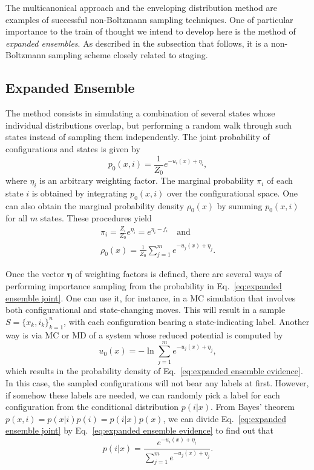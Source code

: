 \documentclass[aip,jcp,preprint,amsmath,amssymb]{revtex4-1}
\newcommand{\vt}[1]{\boldsymbol{\mathbf{#1}}}           %
\begin{document}
The multicanonical approach\cite{Berg_1992, Lee_1993, Abreu_2006} and the enveloping distribution method\cite{Christ_2007, *Christ_2008, *Christ_2009} are examples of successful non-Boltzmann sampling techniques. One of particular importance to the train of thought we intend to develop here is the method of \textit{expanded ensembles}.\cite{Lyubartsev_1992} As described in the subsection that follows, it is a non-Boltzmann sampling scheme closely related to staging.

\subsection{Expanded Ensemble}

The method consists in simulating a combination of several states whose individual distributions overlap, but performing a random walk through such states instead of sampling them independently. The joint probability of configurations and states is given by\cite{Nymeyer_2010}
\begin{equation}
\label{eq:expanded ensemble joint}
p_0(x, i) = \frac{1}{Z_0} e^{-u_i(x) + \eta_i},
\end{equation}
where $\eta_i$ is an arbitrary weighting factor. The marginal probability $\pi_i$ of each state $i$ is obtained by integrating $p_0(x,i)$ over the configurational space. One can also obtain the marginal probability density $\rho_0(x)$ by summing $p_0(x,i)$ for all $m$ states. These procedures yield
\begin{align}
\pi_i = \frac{Z_i}{Z_0} e^{\eta_i} = e^{\eta_i - f_i} \quad \text{and} \label{eq:expanded ensemble prior} \\
\rho_0(x) = \frac{1}{Z_0} \sum_{j=1}^m e^{-u_j(x) + \eta_j}. \label{eq:expanded ensemble evidence}
\end{align}

Once the vector $\vt \eta$ of weighting factors is defined, there are several ways of performing importance sampling from the probability in Eq.~\eqref{eq:expanded ensemble joint}. One can use it, for instance, in a MC simulation that involves both configurational and state-changing moves.\cite{Lyubartsev_1992} This will result in a sample $S = \{x_k,i_k\}_{k=1}^n$, with each configuration bearing a state-indicating label. Another way is via MC or MD of a system whose reduced potential is computed by
\begin{equation}
\label{eq:expanded ensemble potential}
u_0(x) = - \ln \sum_{j=1}^m e^{-u_j(x) + \eta_j},
\end{equation}
which results in the probability density of Eq.~\eqref{eq:expanded ensemble evidence}. In this case, the sampled configurations will not bear any labels at first. However, if somehow these labels are needed, we can randomly pick a label for each configuration from the conditional distribution $p(i|x)$.\cite{Nymeyer_2010} From Bayes' theorem $p(x,i) = p(x|i) p(i) = p(i|x) p(x)$, we can divide Eq.~\eqref{eq:expanded ensemble joint} by Eq.~\eqref{eq:expanded ensemble evidence} to find out that
\begin{equation}
\label{eq:expanded ensemble posterior}
p(i|x) = \frac{e^{-u_i(x) + \eta_i}}{\sum_{j=1}^m e^{-u_j(x) + \eta_j}}.
\end{equation}
\end{document}
